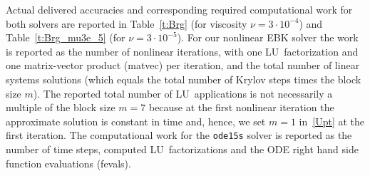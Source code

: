 \documentclass[sn-aps]{sn-jnl}
\theoremstyle{thmstyleone}%
\theoremstyle{thmstyletwo}%
\theoremstyle{thmstylethree}%
\begin{document}
Actual delivered accuracies and corresponding 
required computational work for both solvers are reported in 
Table~\ref{t:Brg} (for viscosity $\nu = 3\cdot 10^{-4}$) 
and Table~\ref{t:Brg_mu3e_5} (for $\nu = 3\cdot 10^{-5}$).
For our nonlinear EBK solver the work is reported as the number of 
nonlinear iterations, with one LU~factorization and one matrix-vector
product (matvec) per iteration, and the total number of linear systems
solutions (which equals the total number of Krylov steps times 
the block size $m$).
The reported total number of 
LU~applications is not necessarily a multiple of the block size $m=7$ because
at the first nonlinear iteration the approximate solution is constant in time
and, hence, we set $m=1$ in~\eqref{Upt} at the first iteration.
The computational work for the \texttt{ode15s} solver is reported as the number 
of time steps, computed LU~factorizations and the ODE right hand side function 
evaluations (fevals).
\end{document}

